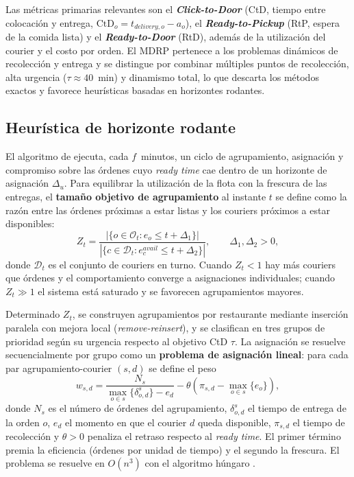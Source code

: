 \documentclass[12pt,letterpaper]{article}
\begin{document}
Las métricas primarias relevantes son el \textbf{\textit{Click-to-Door}} (CtD,
tiempo entre colocación y entrega, $\text{CtD}_o = t_{delivery,o}-a_o$), el
\textbf{\textit{Ready-to-Pickup}} (RtP, espera de la comida lista) y el
\textbf{\textit{Ready-to-Door}} (RtD), además de la utilización del courier y el
costo por orden. El MDRP pertenece a los problemas dinámicos de recolección y
entrega \citep{Pillac2013} y se distingue por combinar múltiples puntos de
recolección, alta urgencia ($\tau\approx 40$~min) y dinamismo total, lo que
descarta los métodos exactos y favorece heurísticas basadas en horizontes
rodantes.

\subsection{Heurística de horizonte rodante}

El algoritmo de \citet{Reyes2018} ejecuta, cada $f$~minutos, un ciclo de
agrupamiento, asignación y compromiso sobre las órdenes cuyo \textit{ready time}
cae dentro de un horizonte de asignación $\Delta_u$. Para equilibrar la
utilización de la flota con la frescura de las entregas, el \textbf{tamaño
objetivo de agrupamiento} al instante $t$ se define como la razón entre las
órdenes próximas a estar listas y los couriers próximos a estar disponibles:
\begin{equation}
	Z_t = \frac{|\{o \in \mathcal{O}_t : e_o \le t + \Delta_1\}|}
	           {|\{c \in \mathcal{D}_t : e^{avail}_c \le t + \Delta_2\}|},
	\qquad \Delta_1,\Delta_2 > 0,
	\label{eq:zt}
\end{equation}
donde $\mathcal{D}_t$ es el conjunto de couriers en turno. Cuando $Z_t<1$ hay más
couriers que órdenes y el comportamiento converge a asignaciones individuales;
cuando $Z_t\gg 1$ el sistema está saturado y se favorecen agrupamientos mayores.

Determinado $Z_t$, se construyen agrupamientos por restaurante mediante inserción
paralela con mejora local (\textit{remove-reinsert}), y se clasifican en tres
grupos de prioridad según su urgencia respecto al objetivo CtD $\tau$. La
asignación se resuelve secuencialmente por grupo como un \textbf{problema de
asignación lineal}: para cada par agrupamiento-courier $(s,d)$ se define el peso
\begin{equation}
	w_{s,d} = \frac{N_s}{\max_{o \in s}\{\delta^s_{o,d}\} - e_d}
	        - \theta\!\left(\pi_{s,d} - \max_{o \in s}\{e_o\}\right),
	\label{eq:matching}
\end{equation}
donde $N_s$ es el número de órdenes del agrupamiento, $\delta^s_{o,d}$ el tiempo
de entrega de la orden $o$, $e_d$ el momento en que el courier $d$ queda
disponible, $\pi_{s,d}$ el tiempo de recolección y $\theta>0$ penaliza el retraso
respecto al \textit{ready time}. El primer término premia la eficiencia (órdenes
por unidad de tiempo) y el segundo la frescura. El problema se resuelve en
$O(n^3)$ con el algoritmo húngaro \citep{Kuhn1955}.
\end{document}
